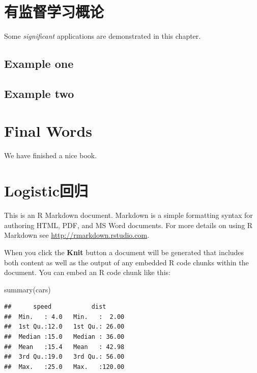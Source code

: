 \documentclass[
]{book}
\newenvironment{Shaded}{\begin{snugshade}}{\end{snugshade}}
\newcommand{\FunctionTok}[1]{\textcolor[rgb]{0.00,0.00,0.00}{#1}}
\newcommand{\NormalTok}[1]{#1}
\begin{document}
\hypertarget{ux6709ux76d1ux7763ux5b66ux4e60ux6982ux8bba}{%
\chapter{有监督学习概论}\label{ux6709ux76d1ux7763ux5b66ux4e60ux6982ux8bba}}

Some \emph{significant} applications are demonstrated in this chapter.

\hypertarget{example-one}{%
\section{Example one}\label{example-one}}

\hypertarget{example-two}{%
\section{Example two}\label{example-two}}

\hypertarget{final-words}{%
\chapter{Final Words}\label{final-words}}

We have finished a nice book.

\hypertarget{logisticux56deux5f52}{%
\chapter{Logistic回归}\label{logisticux56deux5f52}}

This is an R Markdown document. Markdown is a simple formatting syntax for authoring HTML, PDF, and MS Word documents. For more details on using R Markdown see \url{http://rmarkdown.rstudio.com}.

When you click the \textbf{Knit} button a document will be generated that includes both content as well as the output of any embedded R code chunks within the document. You can embed an R code chunk like this:

\begin{Shaded}
\begin{Highlighting}[]
\FunctionTok{summary}\NormalTok{(cars)}
\end{Highlighting}
\end{Shaded}

\begin{verbatim}
##      speed           dist       
##  Min.   : 4.0   Min.   :  2.00  
##  1st Qu.:12.0   1st Qu.: 26.00  
##  Median :15.0   Median : 36.00  
##  Mean   :15.4   Mean   : 42.98  
##  3rd Qu.:19.0   3rd Qu.: 56.00  
##  Max.   :25.0   Max.   :120.00
\end{verbatim}
\end{document}
